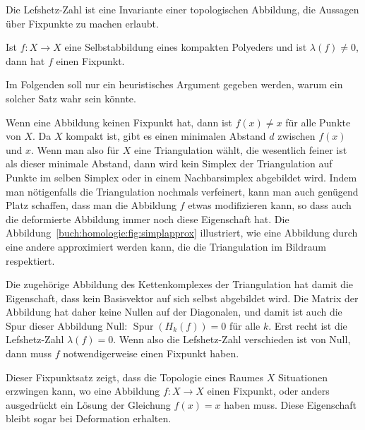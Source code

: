 Die Lefshetz-Zahl ist eine Invariante einer topologischen Abbildung,
die Aussagen über Fixpunkte zu machen erlaubt.

\begin{satz}
Ist $f\colon X\to X$ eine Selbstabbildung eines kompakten Polyeders und
ist $\lambda(f) \ne 0$, dann hat $f$ einen Fixpunkt.
\end{satz}

Im Folgenden soll nur ein heuristisches Argument gegeben werden, warum
ein solcher Satz wahr sein könnte.


Wenn eine Abbildung keinen Fixpunkt hat, dann ist $f(x) \ne x$ für alle
Punkte von $X$.
Da $X$ kompakt ist, gibt es einen minimalen Abstand $d$ zwischen $f(x)$ und $x$.
Wenn man also für $X$ eine Triangulation wählt, die wesentlich feiner ist
als dieser minimale Abstand, dann wird kein Simplex der Triangulation auf
Punkte im selben Simplex oder in einem Nachbarsimplex abgebildet wird.
Indem man nötigenfalls die Triangulation nochmals verfeinert, kann man auch
genügend Platz schaffen, dass man die Abbildung $f$ etwas modifizieren kann,
so dass auch die deformierte Abbildung immer noch diese Eigenschaft hat.
Die Abbildung~\ref{buch:homologie:fig:simplapprox} illustriert, wie eine
Abbildung durch eine andere approximiert werden kann, die die Triangulation
im Bildraum respektiert.

Die zugehörige Abbildung des Kettenkomplexes der Triangulation hat damit
die Eigenschaft, dass kein Basisvektor auf sich selbst abgebildet wird.
Die Matrix der Abbildung hat daher keine Nullen auf der Diagonalen, und
damit ist auch die Spur dieser Abbildung Null: $\operatorname{Spur}(H_k(f))=0$
für alle $k$.
Erst recht ist die Lefshetz-Zahl $\lambda(f)=0$.
Wenn also die Lefshetz-Zahl verschieden ist von Null, dann muss $f$
notwendigerweise einen Fixpunkt haben.

Dieser Fixpunktsatz zeigt, dass die Topologie eines Raumes $X$ Situationen
erzwingen kann, wo eine Abbildung $f\colon X\to X$ einen Fixpunkt, oder
anders ausgedrückt ein Lösung der Gleichung $f(x)=x$ haben muss.
Diese Eigenschaft bleibt sogar bei Deformation erhalten.


